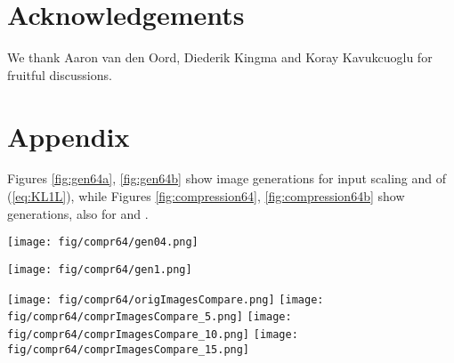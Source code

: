 \documentclass{article}
\begin{document}
\vspace{-0.2cm}
\section*{Acknowledgements} 
We thank Aaron van den Oord, Diederik Kingma and Koray Kavukcuoglu for fruitful discussions. 
 \vspace{-0.2cm}


\nocite{langley00}



\vspace{-0.2cm}
\section*{Appendix}

Figures \ref{fig:gen64a}, \ref{fig:gen64b} show  image generations for input scaling  and  of (\ref{eq:KL1L}), while Figures \ref{fig:compression64}, \ref{fig:compression64b} show  generations, also for   and .

\begin{figure*} \centering
\texttt{[image: fig/compr64/gen04.png]}
\caption{
\textbf{Generated samples from a network trained on  ImageNet with input scaling }. Qualitatively asking the model to be less precise seems to lead to visually more appealing samples.}
\label{fig:gen64a}
\end{figure*}


\begin{figure*} \centering
\texttt{[image: fig/compr64/gen1.png]}
\caption{
\textbf{Generated samples from a network trained on  ImageNet with input scaling }. For this value of , the system dedicates a lot of resources to explain details, losing higher level coherence. As models get better, this problem might disappear. }
\label{fig:gen64b}
\end{figure*}


\begin{figure*} \centering
\texttt{[image: fig/compr64/origImagesCompare.png]}
\texttt{[image: fig/compr64/comprImagesCompare\_5.png]}
\texttt{[image: fig/compr64/comprImagesCompare\_10.png]}
\texttt{[image: fig/compr64/comprImagesCompare\_15.png]}
\caption{\textbf{Lossy Compression, Part 1}
Analogous to Figure~\ref{fig:compression} of the main paper but for  inputs. Example images for various methods and amounts of compression. Top block: original images. Each subsequent block has four methods of compression: JPEG, JPEG2000, convolutional DRAW with full prior variance for generation and convolutional DRAW with zero prior variance. Different blocks correspond to different compression levels, from top to bottom with bits per input dimension: 0.05, 0.1, 0.15, 0.2, 0.4, 0.8. In the first block, JPEG was left gray because it does not compress to this level. }
\label{fig:compression64}
\end{figure*}
\end{document}
